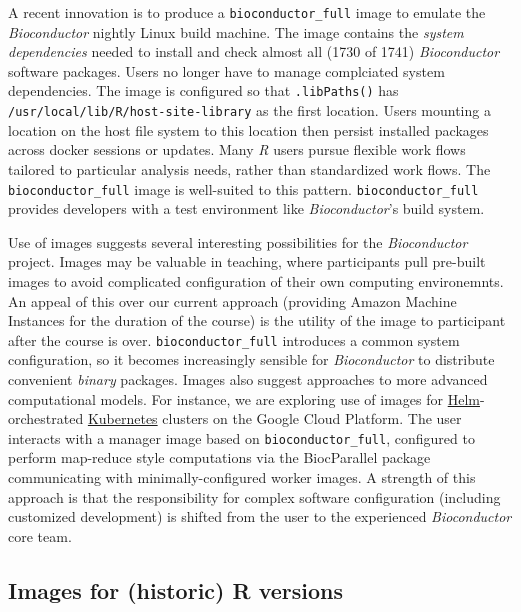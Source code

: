 A recent innovation is to produce a \texttt{bioconductor\_full} image to
emulate the \emph{Bioconductor} nightly Linux build machine. The image
contains the \emph{system dependencies} needed to install and check
almost all (1730 of 1741) \emph{Bioconductor} software packages. Users
no longer have to manage complciated system dependencies. The image is
configured so that \texttt{.libPaths()} has
\texttt{/usr/local/lib/R/host-site-library} as the first location. Users
mounting a location on the host file system to this location then
persist installed packages across docker sessions or updates. Many
\emph{R} users pursue flexible work flows tailored to particular
analysis needs, rather than standardized work flows. The
\texttt{bioconductor\_full} image is well-suited to this pattern.
\texttt{bioconductor\_full} provides developers with a test environment
like \emph{Bioconductor}'s build system.

Use of images suggests several interesting possibilities for the
\emph{Bioconductor} project. Images may be valuable in teaching, where
participants pull pre-built images to avoid complicated configuration of
their own computing environemnts. An appeal of this over our current
approach (providing Amazon Machine Instances for the duration of the
course) is the utility of the image to participant after the course is
over. \texttt{bioconductor\_full} introduces a common system
configuration, so it becomes increasingly sensible for
\emph{Bioconductor} to distribute convenient \emph{binary} packages.
Images also suggest approaches to more advanced computational models.
For instance, we are exploring use of images for
\href{https://helm.sh/}{Helm}-orchestrated
\href{https://kubernetes.io/}{Kubernetes} clusters on the Google Cloud
Platform. The user interacts with a manager image based on
\texttt{bioconductor\_full}, configured to perform map-reduce style
computations via the BiocParallel package communicating with
minimally-configured worker images. A strength of this approach is that
the responsibility for complex software configuration (including
customized development) is shifted from the user to the experienced
\emph{Bioconductor} core team.

\hypertarget{images-for-historic-r-versions}{%
\subsection{Images for (historic) R
versions}\label{images-for-historic-r-versions}}

\label{versions}

